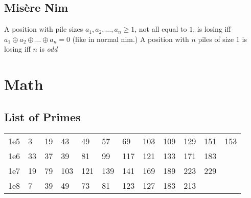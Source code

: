 \documentclass[12pt]{extarticle}
\begin{document}
\begin{multicols*}{2}

\subsection{Mis\`{e}re Nim}
A position with pile sizes $a_1, a_2, \dots, a_n \ge 1$,
not all equal to $1$, is losing iff $a_1 \oplus a_2 \oplus \dots \oplus a_n = 0$
(like in normal nim.)
A position with $n$ piles of size $1$ is losing iff $n$ is \emph{odd}



\section{Math}




\subsection{List of Primes}

\begin{tabular}{l l l l l l l l l l l l}
    1e5 & 3 & 19 & 43 & 49 & 57 & 69 & 103 & 109 & 129 & 151 & 153 \\
    1e6 & 33 & 37 & 39 & 81 & 99 & 117 & 121 & 133 & 171 & 183 \\
    1e7 & 19 & 79 & 103 & 121 & 139 & 141 & 169 & 189 & 223 & 229 \\
    1e8 & 7 & 39 & 49 & 73 & 81 & 123 & 127 & 183 & 213 \\
\end{tabular}

\end{multicols*}
\end{document}
